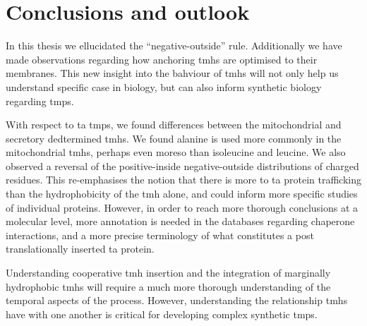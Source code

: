 \chapter{Conclusions and outlook}
\sloppy
In this thesis we ellucidated the ``negative\--outside'' rule.
Additionally we have made observations regarding how anchoring \gls{tmh}s are optimised to their membranes.
This new insight into the bahviour of \gls{tmh}s will not only help us understand specific case in biology, but can also inform synthetic biology regarding \gls{tmp}s.

With respect to \gls{ta} \gls{tmp}s, we found differences between the mitochondrial and secretory dedtermined \gls{tmh}s.
We found alanine is used more commonly in the mitochondrial \gls{tmh}s, perhaps even moreso than isoleucine and leucine.
We also observed a reversal of the positive\--inside negative\--outside distributions of charged residues.
This re\--emphasises the notion that there is more to \gls{ta} protein trafficking than the hydrophobicity of the \gls{tmh} alone, and could inform more specific studies of individual proteins.
However, in order to reach more thorough conclusions at a molecular level, more annotation is needed in the databases regarding chaperone interactions, and a more precise terminology of what constitutes a post translationally inserted \gls{ta} protein.

Understanding cooperative \gls{tmh} insertion and the integration of marginally hydrophobic \gls{tmh}s will require a much more thorough understanding of the temporal aspects of the process. %
However, understanding the relationship \gls{tmh}s have with one another is critical for developing complex synthetic \gls{tmp}s.
